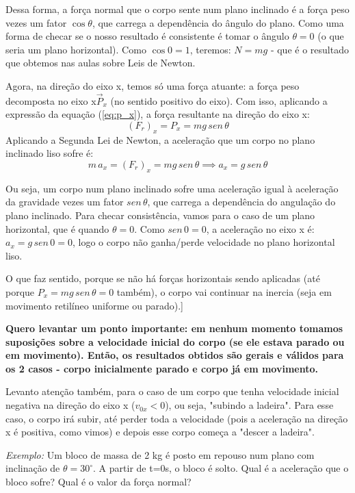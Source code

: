 \documentclass[12pt]{extarticle}
\newcommand{\<}{\langle}
\renewcommand{\>}{\rangle}
\theoremstyle{definition}
\begin{document}
Dessa forma, a força normal que o corpo sente num plano inclinado é a força peso vezes um fator $\cos\theta$, que carrega a dependência do ângulo do plano. Como uma forma de checar se o nosso resultado é consistente é tomar o ângulo $\theta=0$ (o que seria um plano horizontal). Como $\cos 0 =1$, teremos: $N = mg$ - que é o resultado que obtemos nas aulas sobre Leis de Newton.

Agora, na direção do eixo x, temos só uma força atuante: a força peso decomposta no eixo x$\vec{P}_x$ (no sentido positivo do eixo). Com isso, aplicando a expressão da equação (\ref{eq:p_x}), a força resultante na direção do eixo x:
\begin{equation}
    (F_r)_x = P_x = mg\,sen\,\theta
\end{equation}
Aplicando a Segunda Lei de Newton, a aceleração que um corpo no plano inclinado liso sofre é:
\begin{equation}
    m\,a_x = (F_r)_x = mg\,sen\,\theta \implies \boxed{a_x = g\,sen\,\theta}
\end{equation}

Ou seja, um corpo num plano inclinado sofre uma aceleração igual à aceleração da gravidade vezes um fator $sen\,\theta$, que carrega a dependência do angulação do plano inclinado. Para checar consistência, vamos para o caso de um plano horizontal, que é quando $\theta=0$. Como $sen\,0=0$, a aceleração no eixo x é: $a_x = g\,sen\,0 = 0$, logo o corpo não ganha/perde velocidade no plano horizontal liso. 

O que faz sentido, porque se não há forças horizontais sendo aplicadas (até porque $P_x=mg\,sen\,\theta =0$ também), o corpo vai continuar na inercia (seja em movimento retilíneo uniforme ou parado).]

\textbf{Quero levantar um ponto importante: em nenhum momento tomamos suposições sobre a velocidade inicial do corpo (se ele estava parado ou em movimento). Então, os resultados obtidos são gerais e válidos para os 2 casos - corpo inicialmente parado e corpo já em movimento.} 

Levanto atenção também, para o caso de um corpo que tenha velocidade inicial negativa na direção do eixo x ($v_{0x} < 0$), ou seja, "subindo a ladeira". Para esse caso, o corpo irá subir, até perder toda a velocidade (pois a aceleração na direção x é positiva, como vimos) e depois esse corpo começa a "descer a ladeira".

\textit{Exemplo:} Um bloco de massa de 2 kg é posto em repouso num plano com inclinação de $\theta=30^\circ$. A partir de t=0s, o bloco é solto. Qual é a aceleração que o bloco sofre? Qual é o valor da força normal? 
\end{document}
